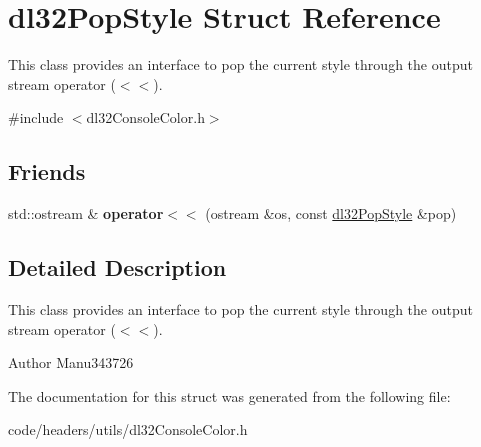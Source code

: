 \hypertarget{structdl32_pop_style}{\section{dl32\-Pop\-Style Struct Reference}
\label{structdl32_pop_style}
}


This class provides an interface to pop the current style through the output stream operator ($<$$<$).  




{\ttfamily \#include $<$dl32\-Console\-Color.\-h$>$}

\subsection*{Friends}
\begin{DoxyCompactItemize}
\item 
\hypertarget{structdl32_pop_style_abf16d7bbef17d445bd0297b464a4af49}{std\-::ostream \& {\bfseries operator$<$$<$} (ostream \&os, const \hyperlink{structdl32_pop_style}{dl32\-Pop\-Style} \&pop)}\label{structdl32_pop_style_abf16d7bbef17d445bd0297b464a4af49}

\end{DoxyCompactItemize}


\subsection{Detailed Description}
This class provides an interface to pop the current style through the output stream operator ($<$$<$). 

\begin{DoxyAuthor}{Author}
Manu343726 
\end{DoxyAuthor}


The documentation for this struct was generated from the following file\-:\begin{DoxyCompactItemize}
\item 
code/headers/utils/dl32\-Console\-Color.\-h\end{DoxyCompactItemize}
